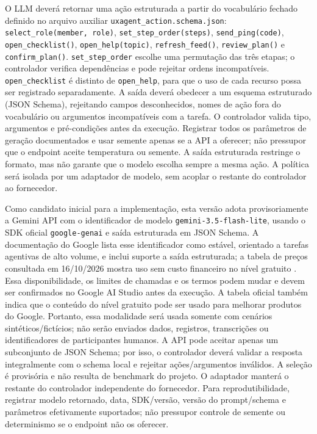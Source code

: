 \documentclass[conference]{IEEEtran}
\begin{document}
O LLM deverá retornar uma ação estruturada a partir do vocabulário fechado definido no arquivo auxiliar \texttt{uxagent\_action.schema.json}: \texttt{select\_role(member, role)}, \texttt{set\_step\_order(steps)}, \texttt{send\_ping(code)}, \texttt{open\_checklist()}, \texttt{open\_help(topic)}, \texttt{refresh\_feed()}, \texttt{review\_plan()} e \texttt{confirm\_plan()}. \texttt{set\_step\_order} escolhe uma permutação das três etapas; o controlador verifica dependências e pode rejeitar ordens incompatíveis. \texttt{open\_checklist} é distinto de \texttt{open\_help}, para que o uso de cada recurso possa ser registrado separadamente. A saída deverá obedecer a um esquema estruturado (JSON Schema), rejeitando campos desconhecidos, nomes de ação fora do vocabulário ou argumentos incompatíveis com a tarefa. O controlador valida tipo, argumentos e pré-condições antes da execução. Registrar todos os parâmetros de geração documentados e usar semente apenas se a API a oferecer; não pressupor que o endpoint aceite temperatura ou semente. A saída estruturada restringe o formato, mas não garante que o modelo escolha sempre a mesma ação. A política será isolada por um adaptador de modelo, sem acoplar o restante do controlador ao fornecedor.

Como candidato inicial para a implementação, esta versão adota provisoriamente a Gemini API com o identificador de modelo \texttt{gemini-3.5-flash-lite}, usando o SDK oficial \texttt{google-genai} e saída estruturada em JSON Schema. A documentação do Google lista esse identificador como estável, orientado a tarefas agentivas de alto volume, e inclui suporte a saída estruturada; a tabela de preços consultada em 16/10/2026 mostra uso sem custo financeiro no nível gratuito \cite{gemini_model,gemini_structured,gemini_pricing}. Essa disponibilidade, os limites de chamadas e os termos podem mudar e devem ser confirmados no Google AI Studio antes da execução. A tabela oficial também indica que o conteúdo do nível gratuito pode ser usado para melhorar produtos do Google. Portanto, essa modalidade será usada somente com cenários sintéticos/fictícios; não serão enviados dados, registros, transcrições ou identificadores de participantes humanos. A API pode aceitar apenas um subconjunto de JSON Schema; por isso, o controlador deverá validar a resposta integralmente com o schema local e rejeitar ações/argumentos inválidos. A seleção é provisória e não resulta de benchmark do projeto. O adaptador manterá o restante do controlador independente do fornecedor. Para reprodutibilidade, registrar modelo retornado, data, SDK/versão, versão do prompt/schema e parâmetros efetivamente suportados; não pressupor controle de semente ou determinismo se o endpoint não os oferecer.
\end{document}
